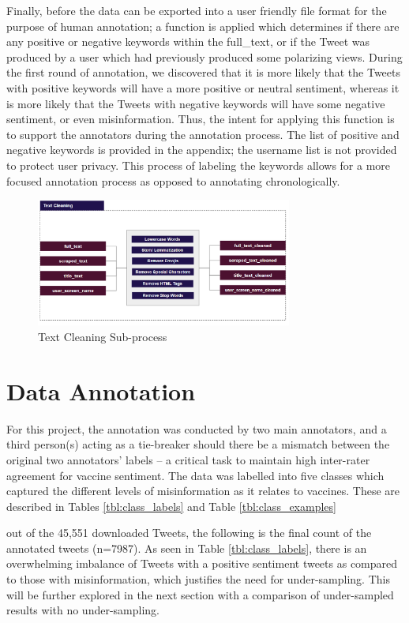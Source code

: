 \documentclass[12pt]{article}
\begin{document}
Finally, before the data can be exported into a user friendly file format for the purpose of human annotation; a function is applied which determines if there are any positive or negative keywords within the full\_text, or if the Tweet was produced by a user which had previously produced some polarizing views. During the first round of annotation, we discovered that it is more likely that the Tweets with positive keywords will have a more positive or neutral sentiment, whereas it is more likely that the Tweets with negative keywords will have some negative sentiment, or even misinformation. Thus, the intent for applying this function is to support the annotators during the annotation process. The list of positive and negative keywords is provided in the appendix; the username list is not provided to protect user privacy. This process of labeling the keywords allows for a more focused annotation process as opposed to annotating chronologically. 

\begin{figure}[tbp]
\centering 
\includegraphics[width=0.75\textwidth]{figures/text_cleaning}
\caption{Text Cleaning Sub-process} 
\label{fig:text_cleaning}
\end{figure}

\section{Data Annotation}

For this project, the annotation was conducted by two main annotators, and a third person(s) acting as a tie-breaker should there be a mismatch between the original two annotators’ labels – a critical task to maintain high inter-rater agreement for vaccine sentiment. The data was labelled into five classes which captured the different levels of misinformation as it relates to vaccines. These are described in Tables \ref{tbl:class_labels} and Table \ref{tbl:class_examples}


out of the 45,551 downloaded Tweets, the following is the final count of the annotated tweets (n=7987). As seen in Table \ref{tbl:class_labels}, there is an overwhelming imbalance of Tweets with a positive sentiment tweets as compared to those with misinformation, which justifies the need for under-sampling. This will be further explored in the next section with a comparison of under-sampled results with no under-sampling. 
\end{document}

